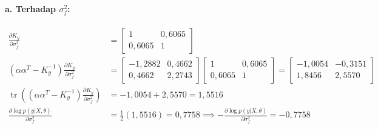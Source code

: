 \documentclass[11pt,a4paper]{article}
\def\boldsymbol#1{#1}%
\def\mathbf#1{#1}%
\begin{document}
\paragraph*{a. Terhadap \texorpdfstring{$\sigma_f^2$}{sigma_f^2}:}
\begin{align}
\frac{\partial K_y}{\partial \sigma_f^2} &= \begin{bmatrix} 1 & 0{,}6065 \\ 0{,}6065 & 1 \end{bmatrix} \\
\left( \boldsymbol{\alpha}\boldsymbol{\alpha}^T - K_y^{-1} \right) \frac{\partial K_y}{\partial \sigma_f^2} &= \begin{bmatrix} -1{,}2882 & 0{,}4662 \\ 0{,}4662 & 2{,}2743 \end{bmatrix} \begin{bmatrix} 1 & 0{,}6065 \\ 0{,}6065 & 1 \end{bmatrix} = \begin{bmatrix} -1{,}0054 & -0{,}3151 \\ 1{,}8456 & 2{,}5570 \end{bmatrix} \\
\operatorname{tr}\left( \left( \boldsymbol{\alpha}\boldsymbol{\alpha}^T - K_y^{-1} \right) \frac{\partial K_y}{\partial \sigma_f^2} \right) &= -1{,}0054 + 2{,}5570 = 1{,}5516 \\
\frac{\partial \log p(\mathbf{y}|X, \boldsymbol{\theta})}{\partial \sigma_f^2} &= \frac{1}{2} (1{,}5516) = 0{,}7758 \implies -\frac{\partial \log p(\mathbf{y}|X, \boldsymbol{\theta})}{\partial \sigma_f^2} = -0{,}7758
\end{align}
\end{document}
